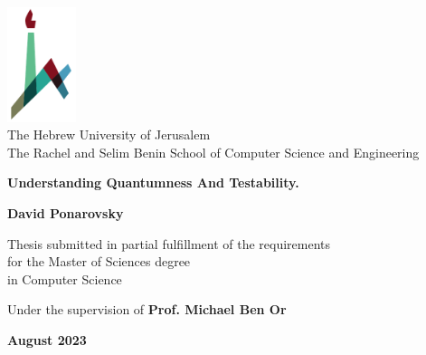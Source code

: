 \documentclass[11pt, oneside]{book}
\begin{document}

\begin{titlepage}
    \begin{center}
        \vspace*{1cm}
        
        \includegraphics[width=0.15\textwidth]{huji_logo_notext.pdf}\\
        { \large The Hebrew University of Jerusalem\\
        The Rachel and Selim Benin School of Computer Science and Engineering }
        
        \vspace{2cm}
        
        {\huge \textbf{Understanding Quantumness And Testability.}}
        
        \vspace{1cm}
        
        \vspace{1.5cm}
        
        { \large \textbf{David Ponarovsky} }
        
        \vspace{1cm}
        
        { \large Thesis submitted in partial fulfillment of the requirements\\for the Master of Sciences degree\\
        in Computer Science } 
        
        \vspace{1cm}
        
        { \large  Under the supervision of \textbf{Prof. Michael Ben Or} }

        
        \vfill
        
        {\large \textbf{August 2023} }
    \end{center}
\end{titlepage}




%

\tableofcontents
\listoffigures
\setlength{\parindent}{0pt}
\setlength{\parskip}{5pt}
% 








\printbibliography[heading=bibliography]
\end{document}

